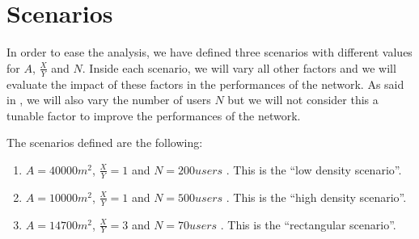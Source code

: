 \section{Scenarios}\label{sec:scenarios}

In order to ease the analysis, we have defined three scenarios with different
values for \(A\), \(\frac{X}{Y}\) and \(N\). Inside each scenario, we will vary
all other factors and we will evaluate the impact of these factors in the
performances of the network. As said in , we will also vary
the number of users \(N\) but we will not consider this a tunable factor to
improve the performances of the network.

The scenarios defined are the following:
\begin{enumerate}
	\item \(A = 40000m^2\), \(\frac{X}{Y} = 1\)  and \(N = 200\mathit{users}\) . This is the ``low density
		scenario''.
	\item \(A = 10000m^2\), \(\frac{X}{Y} = 1\)  and \(N = 500\mathit{users}\) . This is the ``high density
		scenario''.
	\item \(A = 14700m^2\), \(\frac{X}{Y} = 3\)  and \(N = 70\mathit{users}\) .  This is the ``rectangular
		scenario''.
\end{enumerate}


